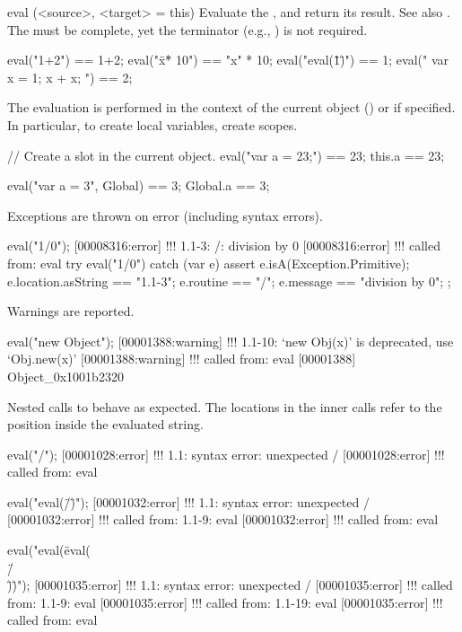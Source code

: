 \begin{urbiscriptapi}
\item[eval](<source>, <target> = this)%
  Evaluate the \us {}, and return its result.  See also
  .  The  must be complete, yet the terminator
  (e.g., \samp{;}) is not required.
\begin{urbiassert}
eval("1+2") == 1+2;
eval("\"x\" * 10") == "x" * 10;
eval("eval(\"1\")") == 1;
eval("{ var x = 1; x + x; }") == 2;
\end{urbiassert}

The evaluation is performed in the context of the current object (\this) or
 if specified.  In particular, to create local variables, create
scopes.
\begin{urbiassert}
// Create a slot in the current object.
eval("var a = 23;") == 23;
this.a == 23;

eval("var a = 3", Global) == 3;
Global.a == 3;
\end{urbiassert}

  Exceptions are thrown on error (including syntax errors).
\begin{urbiscript}
eval("1/0");
[00008316:error] !!! 1.1-3: /: division by 0
[00008316:error] !!!    called from: eval
try
{
  eval("1/0")
}
catch (var e)
{
  assert
  {
    e.isA(Exception.Primitive);
    e.location.asString  == "1.1-3";
    e.routine            == "/";
    e.message            == "division by 0";
  }
};
\end{urbiscript}

  Warnings are reported.

\begin{urbiscript}
eval("new Object");
[00001388:warning] !!! 1.1-10: `new Obj(x)' is deprecated, use `Obj.new(x)'
[00001388:warning] !!!    called from: eval
[00001388] Object_0x1001b2320
\end{urbiscript}

  Nested calls to  behave as expected.  The locations in the
  inner calls refer to the position inside the evaluated string.

\begin{urbiscript}
eval("/");
[00001028:error] !!! 1.1: syntax error: unexpected /
[00001028:error] !!!    called from: eval

eval("eval(\"/\")");
[00001032:error] !!! 1.1: syntax error: unexpected /
[00001032:error] !!!    called from: 1.1-9: eval
[00001032:error] !!!    called from: eval

eval("eval(\"eval(\\\"/\\\")\")");
[00001035:error] !!! 1.1: syntax error: unexpected /
[00001035:error] !!!    called from: 1.1-9: eval
[00001035:error] !!!    called from: 1.1-19: eval
[00001035:error] !!!    called from: eval
\end{urbiscript}



\end{urbiscriptapi}
